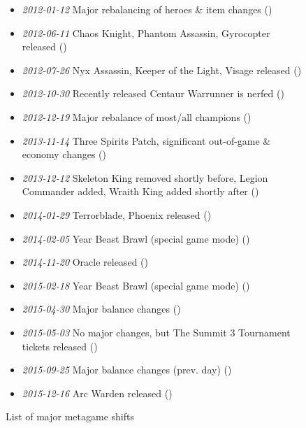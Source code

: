 \begin{figure}[p]
    \centering
    \caption{List of major metagame shifts}
    \label{fig:patches-list}
    \begin{mdframed}
        \begin{itemize}
            \item \emph{2012-01-12} Major rebalancing of heroes \& item changes ()
            \item \emph{2012-06-11} Chaos Knight, Phantom Assassin, Gyrocopter released ()
            \item \emph{2012-07-26} Nyx Assassin, Keeper of the Light, Visage released ()
            \item \emph{2012-10-30} Recently released Centaur Warrunner is nerfed ()
            \item \emph{2012-12-19} Major rebalance of most/all champions ()
            \item \emph{2013-11-14} Three Spirits Patch, significant out-of-game \& economy changes ()
            \item \emph{2013-12-12} Skeleton King removed shortly before, Legion Commander added, Wraith King added shortly after ()
            \item \emph{2014-01-29} Terrorblade, Phoenix released ()
            \item \emph{2014-02-05} Year Beast Brawl (special game mode) ()
            \item \emph{2014-11-20} Oracle released ()
            \item \emph{2015-02-18} Year Beast Brawl (special game mode) ()
            \item \emph{2015-04-30} Major balance changes ()
            \item \emph{2015-05-03} No major changes, but The Summit 3 Tournament tickets released ()
            \item \emph{2015-09-25} Major balance changes (prev. day) ()
            \item \emph{2015-12-16} Arc Warden released ()
        \end{itemize}
    \end{mdframed}
\end{figure}

